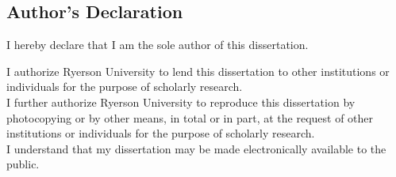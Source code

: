 \thispagestyle{plain}
\subsection*{Author's Declaration}
\noindent I hereby declare that I am the sole author of this dissertation.

\noindent I authorize Ryerson University to lend this dissertation to other institutions or individuals for the purpose of scholarly research.\\

\noindent I further authorize Ryerson University to reproduce this dissertation by photocopying or by other means, in total or in part, at the request of other institutions or individuals for the purpose of scholarly research.\\

\noindent I understand that my dissertation may be made electronically available to the public.
\clearpage
